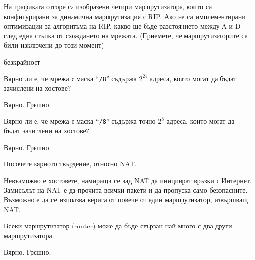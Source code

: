 \begin{questions}
\begin{center}
  \end{center}

  \question[7] На графиката отгоре са изобразени четири маршрутизатора, които са
  конфигурирани за динамична маршрутизация с RIP. Ако не са имплементирани
  оптимизации за алгоритъма на RIP, какво ще бъде разстоянието между A и
  D след една стъпка от схождането на мрежата. (Приемете, че маршрутизаторите са
  били изключени до този момент)

  \begin{oneparchoices}
    \CorrectChoice безкрайност
  \end{oneparchoices}

  \question[6] Вярно ли е, че мрежа с маска "`\texttt{/8}"' съдържа
  $2^{24}$ адреса, които могат да бъдат зачислени на хостове?
  \begin{oneparchoices}
    \choice Вярно.
    \CorrectChoice Грешно.
  \end{oneparchoices}


  \question[6] Вярно ли е, че мрежа с маска "`\texttt{/8}"' съдържа точно
  $2^8$ адреса, които могат да бъдат зачислени на хостове?
  \begin{oneparchoices}
    \choice Вярно.
    \CorrectChoice Грешно.
  \end{oneparchoices}

  \question[7] Посочете вярното твърдение, относно NAT.
  \begin{choices}
    \choice Невъзможно е хостовете, намиращи се зад NAT да инициират връзки с Интернет.
    \choice Замисълът на NAT е да прочита всички пакети и да пропуска само безопасните.
    \CorrectChoice Възможно е да се използва верига от повече от един
    маршрутизатор, извършващ NAT.
  \end{choices}

  \question[6] Всеки маршрутизатор (\foreignlanguage{english}{router}) може да
  бъде свързан най-много с два други маршрутизатора.
  \begin{oneparchoices}
    \choice Вярно.
    \CorrectChoice Грешно.
  \end{oneparchoices}

\end{questions}

